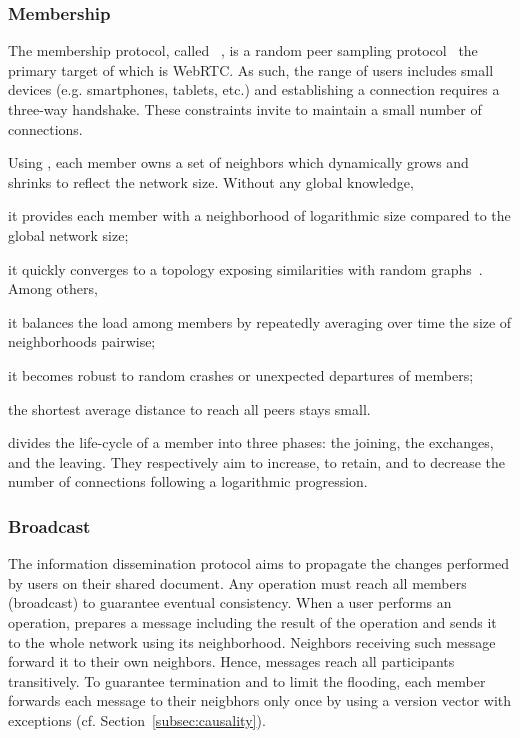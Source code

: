 \subsubsection{Membership}

The membership protocol, called \SPRAY~\cite{nedelec2015spray}, is a random peer
sampling protocol~\cite{jelasity2007gossip} the primary target of which is
WebRTC.  As such, the range of users includes small devices (e.g. smartphones,
tablets, etc.) and establishing a connection requires a three-way
handshake. These constraints invite to maintain a small number of connections.

Using \SPRAY, each member owns a set of neighbors which dynamically grows and
shrinks to reflect the network size. Without any global knowledge,
\begin{inparaenum}[(i)]
\item it provides each member with a neighborhood of logarithmic size compared
  to the global network size;
\item it quickly converges to a topology exposing similarities with random
  graphs~\cite{erdos1959random}. Among others,
  \begin{inparaenum}[(a)]
  \item it balances the load among members by repeatedly averaging over time the
    size of neighborhoods pairwise;
  \item it becomes robust to random crashes or unexpected departures of
    members;
  \item the shortest average distance to reach all peers stays small.
  \end{inparaenum}
\end{inparaenum}

\SPRAY divides the life-cycle of a member into three phases: the joining, the
exchanges, and the leaving. They respectively aim to increase, to retain, and
to decrease the number of connections following a logarithmic progression.

\subsubsection{Broadcast}

The information dissemination protocol\cite{birman1999bimodal} aims to propagate
the changes performed by users on their shared document. Any operation must
reach all members (broadcast) to guarantee eventual consistency.  When a user
performs an operation, \CRATE prepares a message including the result of the
operation and sends it to the whole network using its neighborhood. Neighbors
receiving such message forward it to their own neighbors. Hence, messages reach
all participants transitively. To guarantee termination and to limit the
flooding, each member forwards each message to their neigbhors only once by
using a version vector with exceptions (cf. Section~\ref{subsec:causality}).

